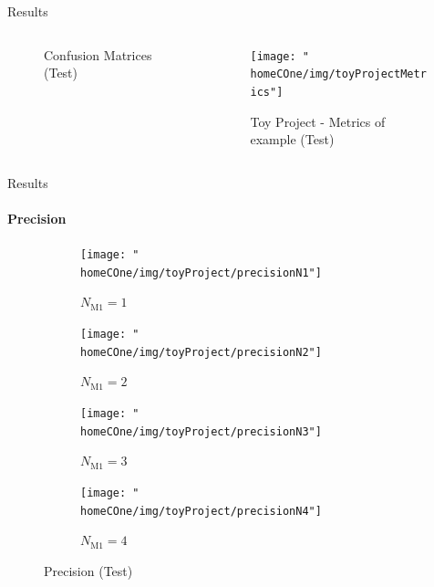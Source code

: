 \documentclass{beamer} %
\newcommand{\homeCOne}{../../Chapter 1 - Metalabeling/Draft}
\begin{document}
\begin{frame}{Results}
\begin{columns}
\begin{column}{.6\textwidth}
\begin{figure}[htbp]
	\vspace{-.15cm}
	
	\caption{Confusion Matrices (Test)}
	\end{figure}
\end{column}

\begin{column}{.4\textwidth}
	\begin{figure}[htbp]
		\centering
		\texttt{[image: "\\homeCOne/img/toyProjectMetrics"]}
		\caption{Toy Project - Metrics of example (Test)}
	\end{figure}
\end{column}
\end{columns}


\end{frame}

\begin{frame}{Results}
\framesubtitle{Precision}
\begin{figure}[htbp]
	\centering
	\begin{subfigure}{.5\textwidth}
	\centering
		\texttt{[image: "\\homeCOne/img/toyProject/precisionN1"]}
	  	\caption{$N_{\text{M1}} = 1$}
	  	\label{fig:precisionN1}
	\end{subfigure}%
	\begin{subfigure}{.5\textwidth}
	\centering
		\texttt{[image: "\\homeCOne/img/toyProject/precisionN2"]}
		\caption{$N_{\text{M1}} = 2$}
		\label{fig:precisionN2}
	\end{subfigure}


	\begin{subfigure}{.5\textwidth}
	\centering
		\texttt{[image: "\\homeCOne/img/toyProject/precisionN3"]}
		\caption{$N_{\text{M1}} = 3$}
		\label{fig:precisionN3}
	\end{subfigure}%
	\begin{subfigure}{.5\textwidth}
	\centering
		\texttt{[image: "\\homeCOne/img/toyProject/precisionN4"]}
		\caption{$N_{\text{M1}} = 4$}
		\label{fig:precisionN4}
	\end{subfigure}
	\vspace{-.3cm}
	\caption{Precision (Test)}
\end{figure}

\end{frame}
\end{document}
